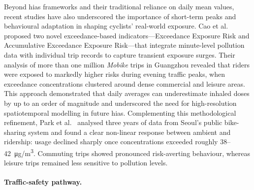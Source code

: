     Beyond \acp{hia} frameworks and their traditional reliance on daily mean  values, recent studies have also underscored the importance of short-term peaks and behavioural adaptation in shaping cyclists’ real-world exposure. Cao et al.~\cite{Cao2021} proposed two novel exceedance-based indicators—Exceedance Exposure Risk and Accumulative Exceedance Exposure Risk—that integrate minute-level pollution data with individual trip records to capture transient exposure surges. Their analysis of more than one million \textit{Mobike} trips in Guangzhou revealed that riders were exposed to markedly higher  risks during evening traffic peaks, when exceedance concentrations clustered around dense commercial and leisure areas. This approach demonstrated that daily averages can underestimate inhaled doses by up to an order of magnitude and underscored the need for high-resolution spatiotemporal modelling in future \acp{hia}. Complementing this methodological refinement, Park et al.~\cite{Park2022} analysed three years of data from Seoul’s public bike-sharing system and found a clear non-linear response between ambient  and ridership: usage declined sharply once concentrations exceeded roughly 38–42~\si{\micro g/m^3}. Commuting trips showed pronounced risk-averting behaviour, whereas leisure trips remained less sensitive to pollution levels.


    \paragraph{Traffic-safety pathway.}

    


